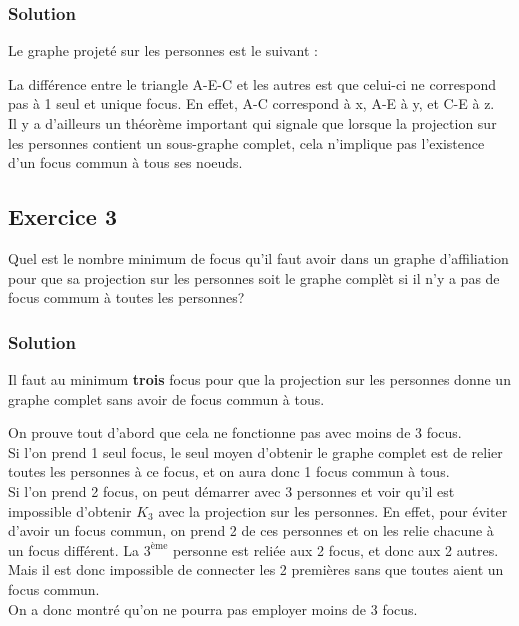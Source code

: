     \subsubsection*{Solution}
    Le graphe projeté sur les personnes est le suivant :
    
    \begin{center}    
    \end{center}
    
    La différence entre le triangle A-E-C et les autres est que celui-ci ne correspond pas à 1 seul et unique focus.
    En effet, A-C correspond à x, A-E à y, et C-E à z.\\
    Il y a d'ailleurs un théorème important qui signale que lorsque la projection sur les personnes contient un sous-graphe complet, cela n'implique pas l'existence d'un focus commun à tous ses noeuds.
    

\subsection*{Exercice 3}
Quel est le nombre minimum de focus qu'il faut avoir dans un graphe d'affiliation
pour que sa projection sur les personnes soit le graphe compl\`{e}t si il n'y a pas de focus commum \`{a} toutes les personnes?

    \subsubsection*{Solution}
    Il faut au minimum \textbf{trois} focus pour que la projection sur les personnes donne un graphe complet sans avoir de focus commun à tous.
    
    On prouve tout d'abord que cela ne fonctionne pas avec moins de 3 focus.\\
    Si l'on prend 1 seul focus, le seul moyen d'obtenir le graphe complet est de relier toutes les personnes à ce focus, et on aura donc 1 focus commun à tous.\\
    Si l'on prend 2 focus, on peut démarrer avec 3 personnes et voir qu'il est impossible d'obtenir $K_3$ avec la projection sur les personnes.
    En effet, pour éviter d'avoir un focus commun, on prend 2 de ces personnes et on les relie chacune à un focus différent.
    La $3^{\text{ème}}$ personne est reliée aux 2 focus, et donc aux 2 autres.
    Mais il est donc impossible de connecter les 2 premières sans que toutes aient un focus commun.\\
    On a donc montré qu'on ne pourra pas employer moins de 3 focus.
    
